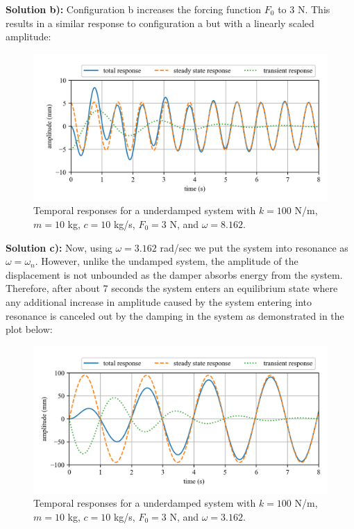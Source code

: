 \documentclass[12pt,letter]{article}
\begin{document}
\begin{example}
		\noindent\textbf{Solution b):} Configuration b increases the forcing function $F_0$ to 3 N. This results in a similar response to configuration a but with a linearly scaled amplitude:
		\begin{figure}[H]
			\centering
			\includegraphics[]{../figures/homogeneous_and_particular_solutions_in_resonance_b.png}
			\caption{Temporal responses for a underdamped system with $k=100$ N/m, $m=10$ kg,  $c=10$ kg/s, $F_0=3$ N, and $\omega = 8.162$.}
		\end{figure}			
		
		\noindent\textbf{Solution c):} Now, using $\omega=3.162$ rad/sec we put the system into resonance as $\omega=\omega_n$. However, unlike the undamped system, the amplitude of the displacement is not unbounded as the damper absorbs energy from the system. Therefore, after about 7 seconds the system enters an equilibrium state where any additional increase in amplitude caused by the system entering into resonance is canceled out by the damping in the system as demonstrated in the plot below:
		\begin{figure}[H]
			\centering
			\includegraphics[]{../figures/homogeneous_and_particular_solutions_in_resonance_c.png}
			\caption{Temporal responses for a underdamped system with $k=100$ N/m, $m=10$ kg,  $c=10$ kg/s, $F_0=3$ N, and $\omega = 3.162$.}
		\end{figure}				
	\end{example}	
\end{document}
